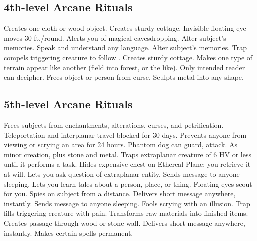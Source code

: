 \subsection{4th-level Arcane Rituals}
\begin{rituallist}
     Creates one cloth or wood object.
     Creates sturdy cottage.
     Invisible floating eye moves 30 ft./round.
     Alerts you of magical eavesdropping.
     Alter subject's memories.
     Speak and understand any language.
     Alter subject's memories.
     Trap compels triggering creature to follow .
     Creates sturdy cottage.
     Makes one type of terrain appear like another (field into forest, or the like).
     Only intended reader can decipher.
     Frees object or person from curse.
     Sculpts metal into any shape.
\end{rituallist}

\subsection{5th-level Arcane Rituals}
\begin{rituallist}
     Frees subjects from enchantments, alterations, curses, and petrification.
     Teleportation and interplanar travel blocked for 30 days.
     Prevents anyone from viewing or scrying an area for 24 hours.
     Phantom dog can guard, attack.
     As minor creation, plus stone and metal.
     Traps extraplanar creature of 6 HV or less until it performs a task.
    \F Hides expensive chest on Ethereal Plane; you retrieve it at will.
     Lets you ask question of extraplanar entity.
     Sends message to anyone sleeping.
    \F Lets you learn tales about a person, place, or thing.
     Floating eyes scout for you.
    \F Spies on subject from a distance.
     Delivers short message anywhere, instantly.
     Sends message to anyone sleeping.
     Fools scrying with an illusion.
     Trap fills triggering creature with pain.
     Transforms raw materials into finished items.
     Creates passage through wood or stone wall.
     Delivers short message anywhere, instantly.
     Makes certain spells permanent.
\end{rituallist}

